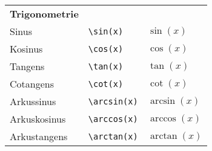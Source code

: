 \begin{table}[H]
\begin{longtable}{>{\raggedright}p{4cm} >{\raggedright}p{6cm} >{\raggedright}p{5cm}}
        \textbf{Trigonometrie}                               &                                                                                         &                                      \\
        Sinus                                                & \texttt{\textbackslash sin{(x)}}                                                        & $ \sin{(x)} $                        \\
        Kosinus                                              & \texttt{\textbackslash cos{(x)}}                                                        & $ \cos{(x)} $                        \\
        Tangens                                              & \texttt{\textbackslash tan{(x)}}                                                        & $ \tan{(x)} $                        \\
        Cotangens                                            & \texttt{\textbackslash cot{(x)}}                                                        & $ \cot{(x)} $                        \\
        Arkussinus                                           & \texttt{\textbackslash arcsin{(x)}}                                                     & $ \arcsin{(x)} $                     \\
        Arkuskosinus                                         & \texttt{\textbackslash arccos{(x)}}                                                     & $ \arccos{(x)} $                     \\
        Arkustangens                                         & \texttt{\textbackslash arctan{(x)}}                                                     & $ \arctan{(x)} $                     \\


\end{longtable}
\end{table}
